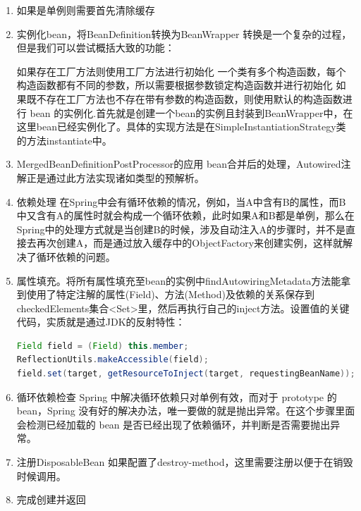 \documentclass[8pt]{book}
\numberwithin{dummy}{section}
\theoremstyle{ocrenumbox}
\theoremstyle{blacknumex}
\theoremstyle{blacknumbox}
\theoremstyle{ocrenum}
\begin{document}
\begin{enumerate}
\item{如果是单例则需要首先清除缓存} 
\item{实例化bean，将BeanDefinition转换为BeanWrapper}
转换是一个复杂的过程，但是我们可以尝试概括大致的功能：

如果存在工厂方法则使用工厂方法进行初始化
一个类有多个构造函数，每个构造函数都有不同的参数，所以需要根据参数锁定构造函数并进行初始化
如果既不存在工厂方法也不存在带有参数的构造函数，则使用默认的构造函数进行 bean 的实例化.首先就是创建一个bean的实例且封装到BeanWrapper中，在这里bean已经实例化了。具体的实现方法是在SimpleInstantiationStrategy类的方法instantiate中。

\item{MergedBeanDefinitionPostProcessor的应用}
bean合并后的处理，Autowired注解正是通过此方法实现诸如类型的预解析。

\item{依赖处理}
在Spring中会有循环依赖的情况，例如，当A中含有B的属性，而B中又含有A的属性时就会构成一个循环依赖，此时如果A和B都是单例，那么在Spring中的处理方式就是当创建B的时候，涉及自动注入A的步骤时，并不是直接去再次创建A，而是通过放入缓存中的ObjectFactory来创建实例，这样就解决了循环依赖的问题。

\item{属性填充。将所有属性填充至bean的实例中}findAutowiringMetadata方法能拿到使用了特定注解的属性(Field)、方法(Method)及依赖的关系保存到checkedElements集合<Set>里，然后再执行自己的inject方法。设置值的关键代码，实质就是通过JDK的反射特性：


\begin{lstlisting}[language=Java]
Field field = (Field) this.member;
ReflectionUtils.makeAccessible(field);
field.set(target, getResourceToInject(target, requestingBeanName));
\end{lstlisting}



\item{循环依赖检查}
Spring 中解决循环依赖只对单例有效，而对于 prototype 的 bean，Spring 没有好的解决办法，唯一要做的就是抛出异常。在这个步骤里面会检测已经加载的 bean 是否已经出现了依赖循环，并判断是否需要抛出异常。

\item{注册DisposableBean}
如果配置了destroy-method，这里需要注册以便于在销毁时候调用。

\item{完成创建并返回}

\end{enumerate}
\end{document}
